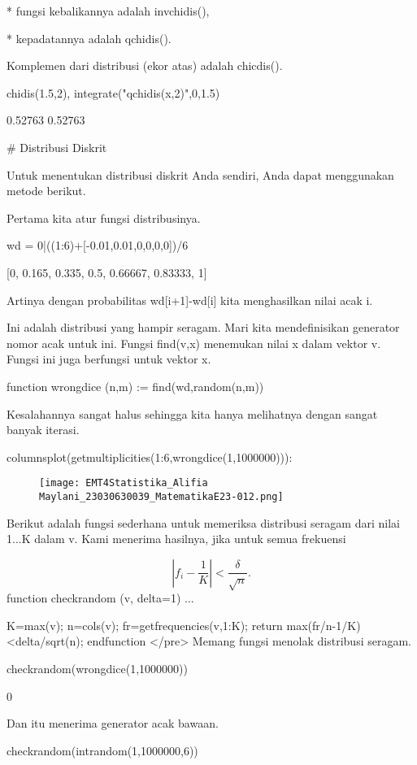 \documentclass{article}
\begin{document}
* 
fungsi kebalikannya adalah invchidis(),

* 
kepadatannya adalah qchidis().


Komplemen dari distribusi (ekor atas) adalah chicdis().


\>chidis(1.5,2), integrate("qchidis(x,2)",0,1.5)


    0.52763
    0.52763

# Distribusi Diskrit

Untuk menentukan distribusi diskrit Anda sendiri, Anda dapat
menggunakan metode berikut.


Pertama kita atur fungsi distribusinya.


\>wd = 0|((1:6)+[-0.01,0.01,0,0,0,0])/6


    [0,  0.165,  0.335,  0.5,  0.66667,  0.83333,  1]

Artinya dengan probabilitas wd[i+1]-wd[i] kita menghasilkan nilai acak
i.


Ini adalah distribusi yang hampir seragam. Mari kita mendefinisikan
generator nomor acak untuk ini. Fungsi find(v,x) menemukan nilai x
dalam vektor v. Fungsi ini juga berfungsi untuk vektor x.


\>function wrongdice (n,m) := find(wd,random(n,m))


Kesalahannya sangat halus sehingga kita hanya melihatnya dengan sangat
banyak iterasi.


\>columnsplot(getmultiplicities(1:6,wrongdice(1,1000000))):


\begin{figure}
    \centering
    \texttt{[image: EMT4Statistika\_Alifia Maylani\_23030630039\_MatematikaE23-012.png]}
    \caption{}
    \label{fig:enter-label}
\end{figure}

Berikut adalah fungsi sederhana untuk memeriksa distribusi seragam
dari nilai 1...K dalam v. Kami menerima hasilnya, jika untuk semua
frekuensi


$$\left|f_i-\frac{1}{K}\right| < \frac{\delta}{\sqrt{n}}.$$\>function checkrandom (v, delta=1) ...


      K=max(v); n=cols(v);
      fr=getfrequencies(v,1:K);
      return max(fr/n-1/K)<delta/sqrt(n);
      endfunction
</pre>
Memang fungsi menolak distribusi seragam.


\>checkrandom(wrongdice(1,1000000))


    0

Dan itu menerima generator acak bawaan.


\>checkrandom(intrandom(1,1000000,6))
\end{document}
